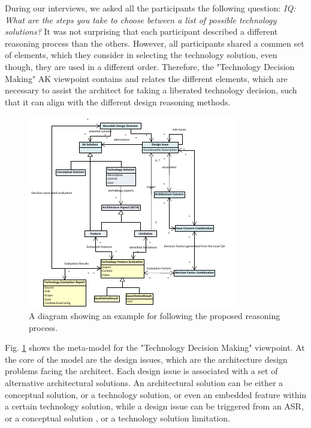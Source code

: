 \documentclass[conference]{IEEEtran}
\begin{document}
During our interviews, we asked all the participants the following question:
 \textit{IQ: What are the steps you take to choose between a list of possible
technology solutions?} It was not surprising that each participant described a
different reasoning process than the others. However, all participants shared a
commen set of elements, which they consider in selecting the technology
solution, even though, they are used in a different order. Therefore, the
"Technology Decision Making" AK viewpoint contains and relates the different
elements, which are necessary to assist the architect for taking a liberated
technology decision, such that it can align with the different design reasoning
methods.
\begin{figure}
	\centering
		\includegraphics[scale=1.6]{TechnologyDecisionMakingView.pdf}
	\caption{A diagram showing an example for following the proposed reasoning
	process.}
	\label{fig:TechnologyDecisionMakingView}
\end{figure}
Fig. \ref{fig:TechnologyDecisionMakingView} shows the meta-model for the
"Technology Decision Making" viewpoint. At the core of the model are the design
issues, which are the architecture design problems facing the architect. Each
design issue is associated with a set of alternative architectural solutions. An
architectural solution can be either a conceptual solution, or a technology
solution, or even an embedded feature within a certain technology solution,
while a design issue can be triggered from an ASR, or a conceptual
solution \cite{Zimmermann2009,Soliman2014}, or a technology solution limitation.
\end{document}
